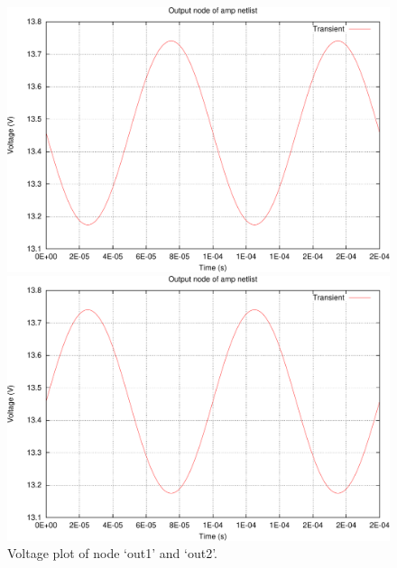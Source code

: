\documentclass{article}
\begin{document}
\begin{figure}[!htbp]
  \centering
    \includegraphics[width=.8\textwidth]{amp_tran1_out1_t-crop.pdf}

    \vspace{2em}

    \includegraphics[width=.8\textwidth]{amp_tran1_out2_t-crop.pdf}
  \caption{Voltage plot of node `out1' and `out2'.}
  \label{fig:tran}
\end{figure}
\end{document}

